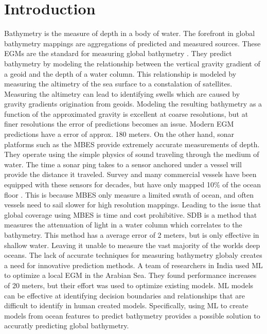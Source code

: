 
\section{Introduction}
\setlength{\parindent}{10ex}
Bathymetry is the measure of depth in a body of water.
The forefront in global bathymetry mappings are aggregations of predicted and measured sources. 
These \ac{EGM}s are the standard for measuring global bathymetry \cite{becker2009global}\cite{smith1994bathymetric}\cite{smith1997global}\cite{smith2010planning}.
They predict bathymetry by modeling the relationship between the vertical gravity gradient of a geoid and the depth of a water column.
This relationship is modeled by measuring the altimetry of the sea surface to a constalation of satellites.
Measuring the altimetry can lead to identifying swells which are caused by gravity gradients origination from geoids.
Modeling the resulting bathymetry as a function of the approximated gravity is excellent at coarse resolutions, but at finer resolutions the error of predictions becomes an issue.
Modern \ac{EGM} predictions have a error of approx. 180 meters.
On the other hand, sonar platforms such as the \ac{MBES} \cite{farr1980multibeam} provide extremely accurate measurements of depth. 
They operate using the simple physics of sound traveling through the medium of water.
The time a sonar ping takes to a sensor anchored under a vessel will provide the distance it traveled.
Survey and many commercial vessels have been equipped with these sensors for decades, but have only mapped 10\% of the ocean floor \cite{becker2009global}.
This is because \ac{MBES} only measure a limited swath of ocean, and often vessels need to sail slower for high resolution mappings.
Leading to the issue that global coverage using \ac{MBES} is time and cost prohibitive.
\ac{SDB} is a method that measures the attenuation of light in a water column which correlates to the bathymetry.
This method has a average error of 2 meters, but is only effective in shallow water.
Leaving it unable to measure the vast majority of the worlds deep oceans.
The lack of accurate techniques for measuring bathymetry globaly creates a need for innovative prediction methods.
A team of researchers in India \cite{jena2012prediction} used \ac{ML} to optimize a local \ac{EGM} in the Arabian Sea.
They found performance increases of 20 meters, but their effort was used to optimize existing models.
\ac{ML} models can be effective at identifying decision boundaries and relationships that are difficult to identify in human created models.
Specifically, using \ac{ML} to create models from ocean features to predict bathymetry provides a possible solution to accuratly predicting global bathymetry.

